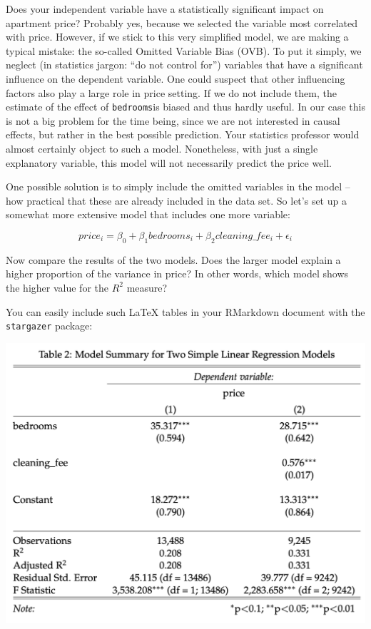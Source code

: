 \documentclass[
  11pt,
]{article}
\newenvironment{tips}[1]
  {
  \begin{itemize}
  \footnotesize
  \renewcommand{\labelitemi}{
    \raisebox{-.7\height}[0pt][0pt]{
      {\setkeys{Gin}{width=3em,keepaspectratio}
        \texttt{[image: images/\#1.png]}}
    }
  }
  \setlength{\fboxsep}{1em}
  \begin{rbox}
  \item
  }
  {
  \end{rbox}
  \end{itemize}
  }
\begin{document}
Does your independent variable have a statistically significant impact on apartment price? Probably yes, because we selected the variable most correlated with price. However, if we stick to this very simplified model, we are making a typical mistake: the so-called Omitted Variable Bias (OVB). To put it simply, we neglect (in statistics jargon: ``do not control for'') variables that have a significant influence on the dependent variable. One could suspect that other influencing factors also play a large role in price setting. If we do not include them, the estimate of the effect of \texttt{bedrooms}is biased and thus hardly useful. In our case this is not a big problem for the time being, since we are not interested in causal effects, but rather in the best possible prediction. Your statistics professor would almost certainly object to such a model. Nonetheless, with just a single explanatory variable, this model will not necessarily predict the price well.

One possible solution is to simply include the omitted variables in the model -- how practical that these are already included in the data set. So let's set up a somewhat more extensive model that includes one more variable:

\[price_i = \beta_0 + \beta_1 bedrooms_i + \beta_2 cleaning\_fee_i + \epsilon_i\]

Now compare the results of the two models. Does the larger model explain a higher proportion of the variance in price? In other words, which model shows the higher value for the \(R^2\) measure?

\begin{tips}r

You can easily include such LaTeX tables in your RMarkdown document with the \texttt{stargazer} package:

\begin{center}\includegraphics[width=1\linewidth]{plot/5_table} \end{center}


\end{tips}
\end{document}
